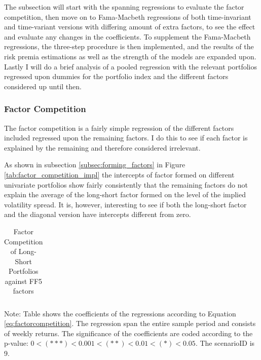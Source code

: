 The subsection will start with the spanning regressions to evaluate the factor competition, then move on to Fama-Macbeth regressions of both time-invariant and time-variant versions with differing amount of extra factors, to see the effect and evaluate any changes in the coefficients. To supplement the Fama-Macbeth regressions, the three-step procedure is then implemented, and the results of the risk premia estimations as well as the strength of the models are expanded upon. Lastly I will do a brief analysis of a pooled regression with the relevant portfolios regressed upon dummies for the portfolio index and the different factors considered up until then.

\subsubsection{Factor Competition}

The factor competition is a fairly simple regression of the different factors included regressed upon the remaining factors. I do this to see if each factor is explained by the remaining and therefore considered irrelevant.

As shown in subsection \ref{subsec:forming_factors} in Figure \ref{tab:factor_competition_impl} the intercepts of factor formed on different univariate portfolios show fairly consistently that the remaining factors do not explain the average of the long-short factor formed on the level of the implied volatility spread. It is, however, interesting to see if both the long-short factor and the diagonal version have intercepts different from zero. 

\begin{table}[ht]
	\centering
	\caption[Factor Competition against FF5]{Factor Competition of Long-Short Portfolios against FF5 factors}
	\label{tab:factor_competition_9}
	
	{\small
		\begin{tabular}{l|llllllll}
			
		\end{tabular}
		
	}
	{\small Note: Table shows the coefficients of the regressions according to Equation \ref{eq:factorcompetition}. The regression span the entire sample period and consists of weekly returns. The significance of  the coefficients are coded according to the p-value: $0 < (\ast\ast\ast) < 0.001 < (\ast\ast) < 0.01 < (\ast) < 0.05$. The scenarioID is 9.}
	
\end{table}

